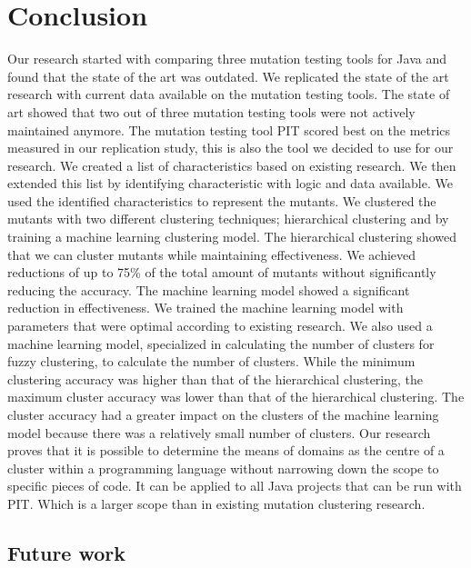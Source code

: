 \documentclass[../main]{subfiles}
\begin{document}
\chapter{Conclusion}
\label{ch:conclusion}
Our research started with comparing three mutation testing tools for Java and found that the state of the art was outdated.
We replicated the state of the art research with current data available on the mutation testing tools.
The state of art showed that two out of three mutation testing tools were not actively maintained anymore.
The mutation testing tool PIT scored best on the metrics measured in our replication study, this is also the tool we decided to use for our research.
\newline
We created a list of characteristics based on existing research. 
We then extended this list by identifying characteristic with logic and data available.
We used the identified characteristics to represent the mutants.
\newline
We clustered the mutants with two different clustering techniques; hierarchical clustering and by training a machine learning clustering model.
The hierarchical clustering showed that we can cluster mutants while maintaining effectiveness.
We achieved reductions of up to 75\% of the total amount of mutants without significantly reducing the accuracy.
\newline
The machine learning model showed a significant reduction in effectiveness.
We trained the machine learning model with parameters that were optimal according to existing research. 
We also used a machine learning model, specialized in calculating the number of clusters for fuzzy clustering, to calculate the number of clusters.
While the minimum clustering accuracy was higher than that of the hierarchical clustering, the maximum cluster accuracy was lower than that of the hierarchical clustering.
The cluster accuracy had a greater impact on the clusters of the machine learning model because there was a relatively small number of clusters.
Our research proves that it is possible to determine the means of domains as the centre of a cluster within a programming language without narrowing down the scope to specific pieces of code.
It can be applied to all Java projects that can be run with PIT. 
Which is a larger scope than in existing mutation clustering research.

\section{Future work}
\label{sec:future_work}
\end{document}
